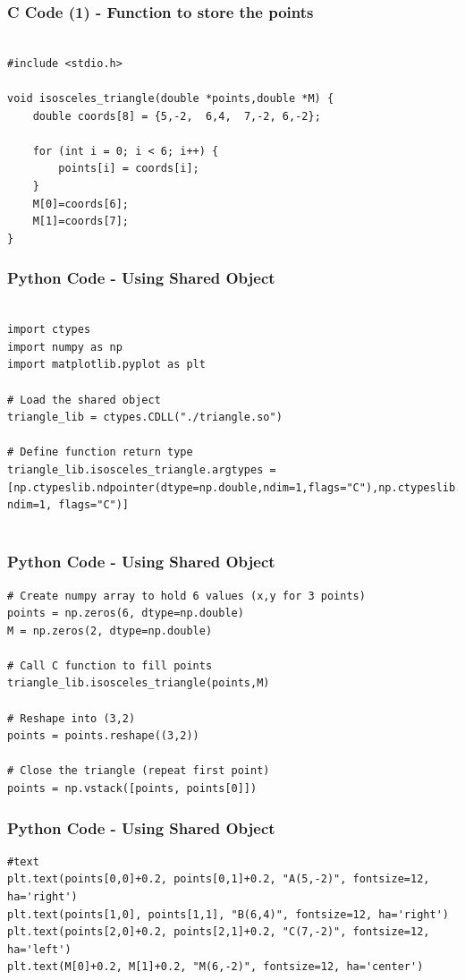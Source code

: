 \documentclass{beamer}
\begin{document}
\begin{frame}[fragile]
    \frametitle{C Code (1) - Function to store the points }

    \begin{lstlisting}

#include <stdio.h>

void isosceles_triangle(double *points,double *M) {
    double coords[8] = {5,-2,  6,4,  7,-2, 6,-2};

    for (int i = 0; i < 6; i++) {
        points[i] = coords[i];
    }
    M[0]=coords[6];
    M[1]=coords[7];
}
    \end{lstlisting}
\end{frame}


\begin{frame}[fragile]
    \frametitle{Python Code - Using Shared Object}
    \begin{lstlisting}

import ctypes
import numpy as np
import matplotlib.pyplot as plt

# Load the shared object
triangle_lib = ctypes.CDLL("./triangle.so")

# Define function return type
triangle_lib.isosceles_triangle.argtypes = [np.ctypeslib.ndpointer(dtype=np.double,ndim=1,flags="C"),np.ctypeslib.ndpointer(dtype=np.double, ndim=1, flags="C")]


\end{lstlisting}
\end{frame}

\begin{frame}[fragile]
    \frametitle{Python Code - Using Shared Object}
    \begin{lstlisting}
# Create numpy array to hold 6 values (x,y for 3 points)
points = np.zeros(6, dtype=np.double)
M = np.zeros(2, dtype=np.double)

# Call C function to fill points
triangle_lib.isosceles_triangle(points,M)

# Reshape into (3,2)
points = points.reshape((3,2))

# Close the triangle (repeat first point)
points = np.vstack([points, points[0]])

\end{lstlisting}
\end{frame}
\begin{frame}[fragile]
    \frametitle{Python Code - Using Shared Object}
    \begin{lstlisting}
#text
plt.text(points[0,0]+0.2, points[0,1]+0.2, "A(5,-2)", fontsize=12, ha='right')
plt.text(points[1,0], points[1,1], "B(6,4)", fontsize=12, ha='right')
plt.text(points[2,0]+0.2, points[2,1]+0.2, "C(7,-2)", fontsize=12, ha='left')
plt.text(M[0]+0.2, M[1]+0.2, "M(6,-2)", fontsize=12, ha='center')





\end{lstlisting}
\end{frame}
\end{document}
